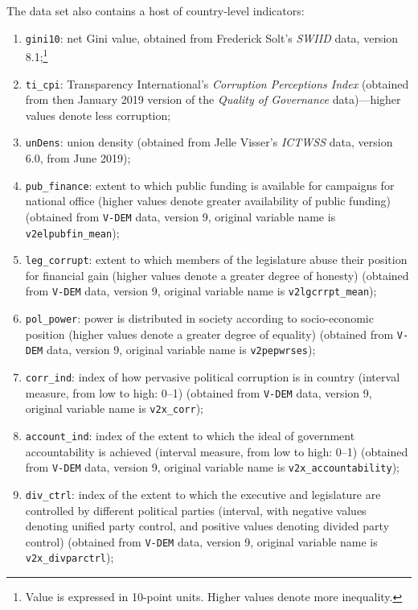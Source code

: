 \documentclass[12pt,english]{article}
\begin{document}
The data set also contains a host of country-level indicators:

\begin{enumerate}
  \item \texttt{gini10}: net Gini value, obtained from Frederick Solt's \textit{SWIID} data, version 8.1;\footnote{Value is expressed in 10-point units. Higher values denote more inequality.}
  \item \texttt{ti\_cpi}: Transparency International's \textit{Corruption Perceptions Index} (obtained from then January 2019 version of the \textit{Quality of Governance} data)---higher values denote less corruption;
  \item \texttt{unDens}: union density (obtained from Jelle Visser's \textit{ICTWSS} data, version 6.0, from June 2019);
  \item \texttt{pub\_finance}: extent to which public funding is available for campaigns for national office (higher values denote greater availability of public funding) (obtained from \texttt{V-DEM} data, version 9, original variable name is \texttt{v2elpubfin\_mean});
  \item \texttt{leg\_corrupt}: extent to which members of the legislature abuse their position for financial gain (higher values denote a greater degree of honesty) (obtained from \texttt{V-DEM} data, version 9, original variable name is \texttt{v2lgcrrpt\_mean});
  \item \texttt{pol\_power}: power is distributed in society according to socio-economic position (higher values denote a greater degree of equality) (obtained from \texttt{V-DEM} data, version 9, original variable name is \texttt{v2pepwrses});
  \item \texttt{corr\_ind}: index of how pervasive political corruption is in country (interval measure, from low to high: 0--1) (obtained from \texttt{V-DEM} data, version 9, original variable name is \texttt{v2x\_corr});
  \item \texttt{account\_ind}: index of the extent to which the ideal of government accountability is achieved (interval measure, from low to high: 0--1) (obtained from \texttt{V-DEM} data, version 9, original variable name is \texttt{v2x\_accountability});
  \item \texttt{div\_ctrl}: index of the extent to which the executive and legislature are controlled by different political parties (interval, with negative values denoting unified party control, and positive values denoting divided party control) (obtained from \texttt{V-DEM} data, version 9, original variable name is \texttt{v2x\_divparctrl});

\end{enumerate}
\end{document}
